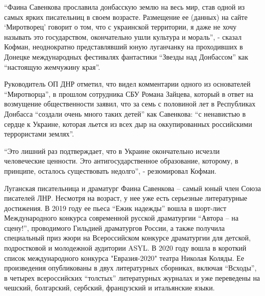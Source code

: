 \enquote{Фаина Савенкова прославила донбасскую землю на весь мир, став одной из самых
ярких писательниц в своем возрасте. Размещение ее (данных) на сайте
\enquote{Миротворец} говорит о том, что с украинской территории, я даже не хочу
называть это государством, окончательно ушли культура и мораль}, - сказал
Кофман, неоднократно представлявший юную луганчанку на проходивших в Донецке
международных фестивалях фантастики \enquote{Звезды над Донбассом} как \enquote{настоящую
жемчужину края}.

Руководитель ОП ДНР отметил, что видел комментарии одного из основателей
\enquote{Миротворца}, в прошлом сотрудника СБУ Романа Зайцева, который в ответ на
возмущение общественности заявил, что за семь с половиной лет в Республиках
Донбасса \enquote{создали очень много таких детей} как Савенкова: \enquote{с ненавистью в
сердце к Украине, которая льется из всех дыр на оккупированных российскими
террористами землях}.

\enquote{Это лишний раз подтверждает, что в Украине окончательно исчезли человеческие
ценности. Это антигосударственное образование, которому, в принципе, осталось
существовать недолго}, - резюмировал Кофман.

Луганская писательница и драматург Фаина Савенкова – самый юный член Союза
писателей ЛНР. Несмотря на возраст, у нее уже есть серьезные литературные
достижения. В 2019 году ее пьеса \enquote{Ежик надежды} вошла в шорт-лист
Международного конкурса современной русской драматургии \enquote{Автора – на сцену!},
проводимого Гильдией драматургов России, а также получила специальный приз жюри
на Всероссийском конкурсе драматургии для детской, подростковой и молодежной
аудитории ASYL. В 2020 году вошла в короткий список международного конкурса
"Евразия-2020" театра Николая Коляды. Ее произведения опубликованы в двух
литературных сборниках, включая \enquote{Всходы}, в четырех всероссийских \enquote{толстых}
литературных журналах и уже переведены на чешский, болгарский, сербский,
французский и итальянские языки.

